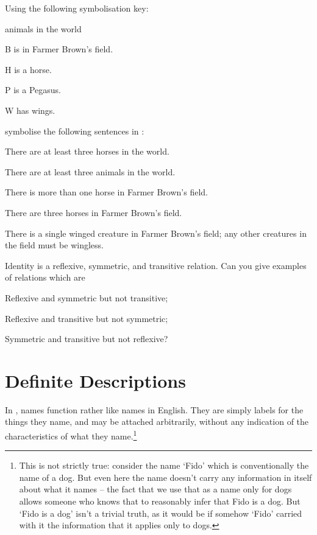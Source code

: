 \problempart Using the following symbolisation key:
\begin{ekey}
\item[\text{domain}] animals in the world
\item[B]  is in Farmer Brown's field.
\item[H]  is a horse.
\item[P]  is a Pegasus.
\item[W]  has wings.
\end{ekey}
symbolise the following sentences in \FOL:
\begin{earg}
\item There are at least three horses in the world.
\item There are at least three animals in the world.
\item There is more than one horse in Farmer Brown's field.
\item There are three horses in Farmer Brown's field.
\item There is a single winged creature in Farmer Brown's field; any other creatures in the field must be wingless.
\end{earg}

\problempart
Identity is a reflexive, symmetric, and transitive relation. Can you give examples of relations which are \begin{earg}
	\item Reflexive and symmetric but not transitive;
	\item Reflexive and transitive but not symmetric;
	\item Symmetric and transitive but not reflexive?
\end{earg}


\chapter{Definite Descriptions}\label{subsec.defdesc}

In \FOL, names function rather like names in English. They are simply labels for the things they name, and may be attached arbitrarily, without any indication of the characteristics of what they name.\footnote{This is not strictly true: consider the name `Fido' which is conventionally the name of a dog. But even here the name doesn't carry any information in itself about what it names – the fact that we use that as a name only for dogs allows someone who knows that to reasonably infer that Fido is a dog. But `Fido is a dog' isn't a trivial truth, as it would be if somehow `Fido' carried with it the information that it applies only to dogs.} 

